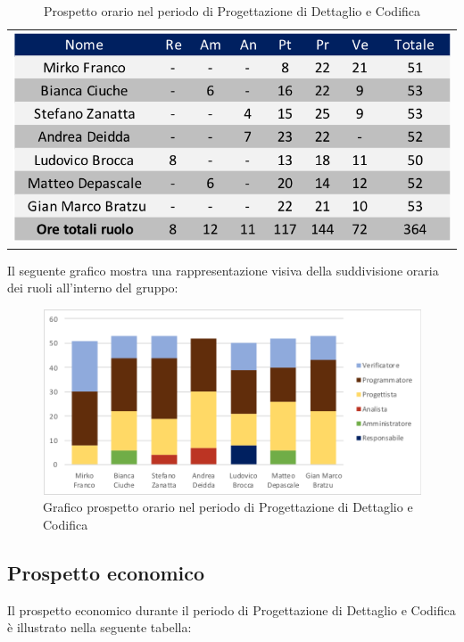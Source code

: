 \begin{table}[!ht]
	\begin{center}
		\begin{tabular}{c}
			\includegraphics[scale=0.90]{images/tabellaProgettazioneDettaglioCodifica.png}
		\end{tabular}
		\caption{Prospetto orario nel periodo di Progettazione di Dettaglio e Codifica}
	\end{center}
\end{table}

Il seguente grafico mostra una rappresentazione visiva della suddivisione oraria dei ruoli all'interno del gruppo:
\begin{figure}[!ht]
	\begin{center}
		\includegraphics[scale=0.80]{images/grafoProgettazioneDettaglioCodifica.png}
		\caption{Grafico prospetto orario nel periodo di Progettazione di Dettaglio e Codifica}
	\end{center}
\end{figure}

\subsection{Prospetto economico}
Il prospetto economico durante il periodo di Progettazione di Dettaglio e Codifica è illustrato nella seguente tabella:

